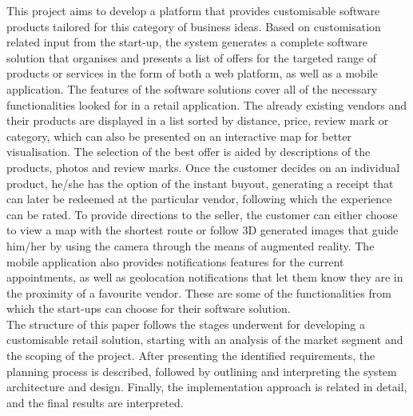 This project aims to develop a platform that provides customisable software products tailored for this category of business ideas. Based on customisation related input from the start-up, the system generates a complete software solution that organises and presents a list of offers for the targeted range of products or services in the form of both a web platform, as well as a mobile application. The features of the software solutions cover all of the necessary functionalities looked for in a retail application. The already existing vendors and their products are displayed in a list sorted by distance, price, review mark or category, which can also be presented on an interactive map for better visualisation. The selection of the best offer is aided by descriptions of the products, photos and review marks. Once the customer decides on an individual product, he/she has the option of the instant buyout, generating a receipt that can later be redeemed at the particular vendor, following which the experience can be rated. To provide directions to the seller, the customer can either choose to view a map with the shortest route or follow 3D generated images that guide him/her by using the camera through the means of augmented reality. The mobile application also provides notifications features for the current appointments, as well as geolocation notifications that let them know they are in the proximity of a favourite vendor. These are some of the functionalities from which the start-ups can choose for their software solution.\\

The structure of this paper follows the stages underwent for developing a customisable retail solution, starting with an analysis of the market segment and the scoping of the project. After presenting the identified requirements, the planning process is described, followed by outlining and interpreting the system architecture and design. Finally, the implementation approach is related in detail, and the final results are interpreted.
